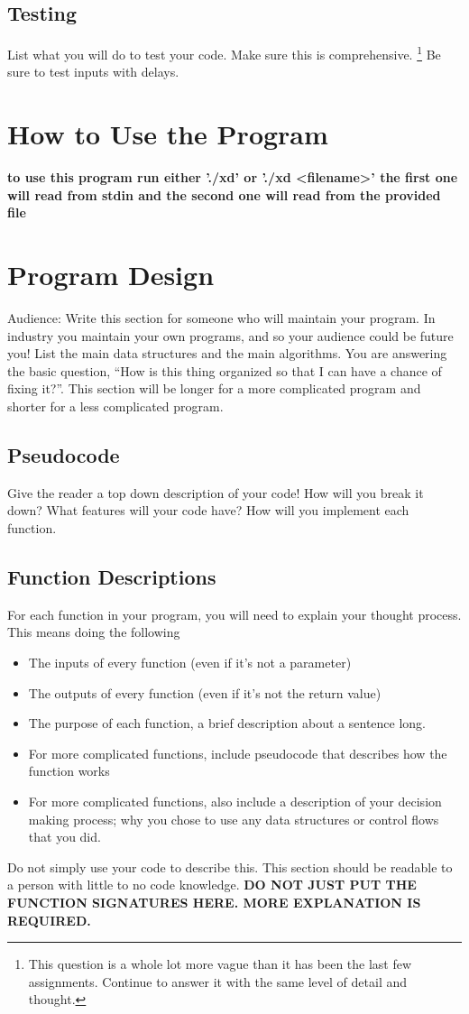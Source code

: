 \documentclass{article}
\begin{document}
\subsection*{Testing}
List what you will do to test your code. Make sure this is comprehensive. \footnote{This question is a whole lot more vague than it has been the last few assignments. Continue to answer it with the same level of detail and thought.} Be sure to test inputs with delays. 


\section*{How to Use the Program}

\textbf{to use this program run either './xd' or './xd <filename>' the first one will read from stdin and the second one will read from the provided file}

\section*{Program Design}

Audience: Write this section for someone
who will maintain your program.
In industry you maintain your own
programs, and so your audience could be
future you! List
the main data structures and the main
algorithms. You are answering the basic
question, ``How is this thing organized
so that I can have a chance of fixing
it?''. This section will be longer for a
more complicated program and shorter for
a less complicated program.

\subsection*{Pseudocode}
Give the reader a top down description of your code! How will you break it down? What features will your code have? 
How will you implement each function. 

\subsection*{Function Descriptions}
For each function in your program, you will need to explain your thought process. This means doing the following
\begin{itemize}
    \item The inputs of every function (even if it's not a parameter)
    \item The outputs of every function (even if it's not the return value)
    \item The purpose of each function, a brief description about a sentence long. 
    \item For more complicated functions, include pseudocode that describes how the function works
    \item For more complicated functions, also include a description of your decision making process; why you chose to use any data structures or control flows that you did.
\end{itemize}
Do not simply use your code to describe this. This section should be readable to a person with little to no code knowledge. 
\textbf{DO NOT JUST PUT THE FUNCTION SIGNATURES HERE. MORE EXPLANATION IS REQUIRED.}
\end{document}
